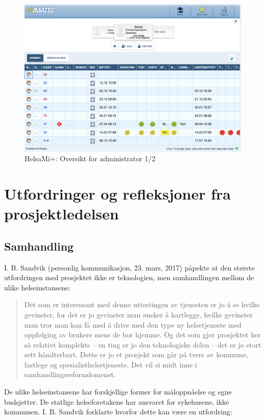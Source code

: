\begin{figure}
\includegraphics[width=1.0\textwidth,center]{fig/helsami/admin_oversikt}
\caption{HelsaMi+: Oversikt for administrator 1/2}
\label{fig:helsami_admin1}
\end{figure}

\section{Utfordringer og refleksjoner fra prosjektledelsen}

\subsection{Samhandling}
I. B. Sandvik (personlig kommunikasjon, 23. mars, 2017) påpekte at den største utfordringen med prosjektet ikke er teknologien, men samhandlingen mellom de ulike
helseinstansene:

\blockquote{Det som er interessant med denne uttestingen av tjenesten er jo å se hvilke gevinster, for det er jo gevinster man ønsker å kartlegge, hvilke gevinster man tror
    man kan få med å drive med den type ny helsetjeneste med oppfølging av brukere mens de bor hjemme. Og det som gjør prosjektet her så relativt komplekts -- en ting
    er jo den teknologiske delen -- det er jo stort sett håndterbart. Dette er jo et prosjekt som går på tvers av kommune, fastlege og spesialisthelsetjeneste. Det vil
si midt inne i samhandlingsreformdomenet.}

De ulike helseinstansene har forskjellige former for måloppnåelse og egne budsjetter. De statlige helseforetakene har ansvaret for sykehusene,
ikke kommunen. I. B. Sandvik forklarte hvorfor dette kan være en utfordring:

